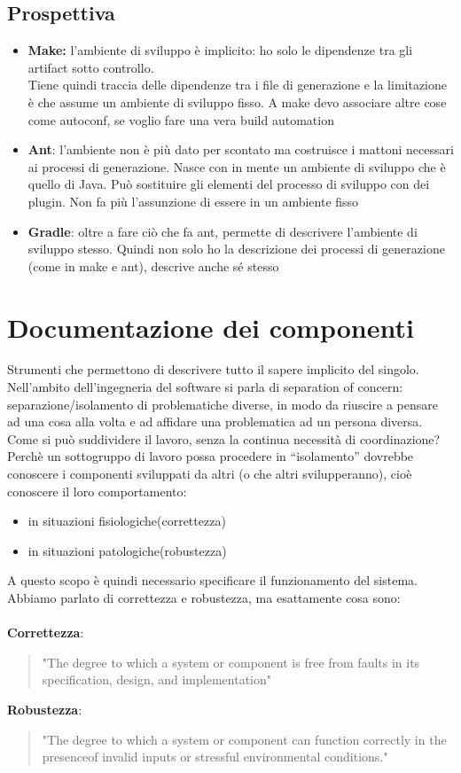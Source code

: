 \subsection{Prospettiva}
\begin{itemize}
    \item \textbf{Make:} l'ambiente di sviluppo è implicito: ho solo le dipendenze tra gli artifact sotto controllo.
    \\ Tiene quindi traccia delle dipendenze tra i file di generazione e la limitazione è che assume un ambiente di sviluppo fisso. A make devo associare altre cose come autoconf, se voglio fare una vera build automation
    \item \textbf{Ant}: l'ambiente non è più dato per scontato ma costruisce i mattoni necessari ai processi di generazione. Nasce con in mente un ambiente di sviluppo che è quello di Java.
    Può sostituire gli elementi del processo di sviluppo con dei plugin. Non fa più l'assunzione di essere in un ambiente fisso
    \item \textbf{Gradle}: oltre a fare ciò che fa ant, permette di descrivere l'ambiente di sviluppo stesso. Quindi non solo ho la descrizione dei processi di generazione (come in make e ant), descrive anche sé stesso
\end{itemize}

\clearpage
\section{Documentazione dei componenti}
Strumenti che permettono di descrivere tutto il sapere implicito del singolo. Nell'ambito dell'ingegneria del software si parla di separation of concern: separazione/isolamento di problematiche diverse, in modo da riuscire a pensare ad una cosa alla volta e ad affidare una problematica ad un persona diversa. \\ Come si può suddividere il lavoro, senza la continua necessità di coordinazione? Perchè un sottogruppo di lavoro possa procedere in “isolamento” dovrebbe conoscere i componenti sviluppati da altri (o che altri svilupperanno), cioè conoscere il loro comportamento:
\begin{itemize}
    \item in situazioni fisiologiche(correttezza)
    \item in situazioni patologiche(robustezza)
\end{itemize}
A questo scopo è quindi necessario specificare il funzionamento del sistema.\\
\noindent Abbiamo parlato di correttezza e robustezza, ma esattamente cosa sono:\\\\
\textbf{Correttezza}: \begin{quote}
    "The degree to which a system or component is free from faults in its specification, design, and implementation"
\end{quote}
\textbf{Robustezza}: \begin{quote}
"The degree to which a system or component can function correctly in the presenceof invalid inputs or stressful environmental conditions."
\end{quote}

